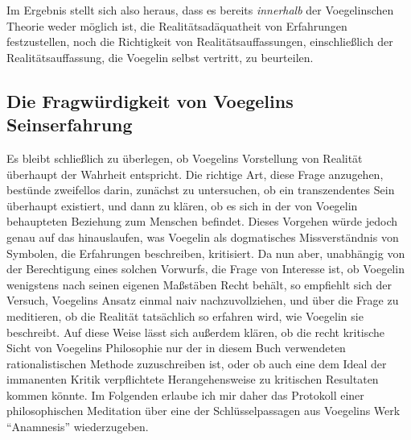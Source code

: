 Im Ergebnis stellt sich also heraus, dass es bereits {\it innerhalb} der
Voegelinschen Theorie weder möglich ist, die Realitätsadäquatheit von
Erfahrungen festzustellen, noch die Richtigkeit von Realitätsauf\/fassungen,
einschließlich der Realitätsauf\/fassung, die Voegelin selbst vertritt, zu
beurteilen.

\subsection{Die Fragwürdigkeit von Voegelins Seinserfahrung} 
\label{KritikVoegelinsSeinserfahrung}

Es bleibt schließlich zu überlegen, ob Voegelins Vorstellung von Realität
überhaupt der Wahrheit entspricht. Die richtige Art, diese Frage anzugehen,
bestünde zweifellos darin, zunächst zu untersuchen, ob ein transzendentes Sein
überhaupt existiert, und dann zu klären, ob es sich in der von Voegelin
behaupteten Beziehung zum Menschen befindet. Dieses Vorgehen würde jedoch
genau auf das hinauslaufen, was Voegelin als dogmatisches Missverständnis von
Symbolen, die Erfahrungen beschreiben, kritisiert. Da nun aber, unabhängig von
der Berechtigung eines solchen Vorwurfs, die Frage von Interesse ist, ob
Voegelin wenigstens nach seinen eigenen Maßstäben Recht behält, so empfiehlt
sich der Versuch, Voegelins Ansatz einmal naiv nachzuvollziehen, und über die
Frage zu meditieren, ob die Realität tatsächlich so erfahren wird, wie
Voegelin sie beschreibt. Auf diese Weise lässt sich außerdem klären, ob die
recht kritische Sicht von Voegelins Philosophie nur der in diesem Buch
verwendeten rationalistischen Methode zuzuschreiben ist, oder ob auch eine dem
Ideal der immanenten Kritik verpflichtete Herangehensweise zu kritischen
Resultaten kommen könnte. Im Folgenden erlaube ich mir daher das Protokoll
einer philosophischen Meditation über eine der Schlüsselpassagen aus Voegelins
Werk "`Anamnesis"' wiederzugeben.

